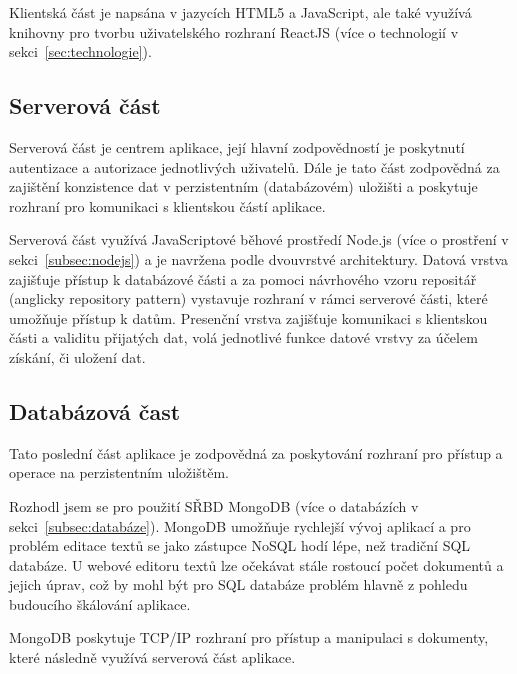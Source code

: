 Klientská část je napsána v jazycích HTML5 a JavaScript, ale také využívá knihovny pro tvorbu uživatelského rozhraní ReactJS (více o technologií v sekci~\ref{sec:technologie}).

\subsection{Serverová část}\label{subsec:serverováČást}

Serverová část je centrem aplikace, její hlavní zodpovědností je poskytnutí autentizace a autorizace jednotlivých uživatelů.
Dále je tato část zodpovědná za zajištění konzistence dat v perzistentním (databázovém) uložišti a poskytuje rozhraní pro komunikaci s klientskou částí aplikace.

Serverová část využívá JavaScriptové běhové prostředí Node.js (více o prostření v sekci~\ref{subsec:nodejs}) a je navržena podle dvouvrstvé architektury.
Datová vrstva zajišťuje přístup k databázové části a za pomoci návrhového vzoru repositář (anglicky repository pattern) vystavuje rozhraní v rámci serverové části, které umožňuje přístup k datům.
Presenční vrstva zajišťuje komunikaci s klientskou části a validitu přijatých dat, volá jednotlivé funkce datové vrstvy za účelem získání, či uložení dat.

\subsection{Databázová čast}\label{subsec:databázováČast}

Tato poslední část aplikace je zodpovědná za poskytování rozhraní pro přístup a operace na perzistentním uložištěm.

Rozhodl jsem se pro použití \gls{SŘBD} MongoDB (více o databázích v sekci~\ref{subsec:databáze}).
MongoDB umožňuje rychlejší vývoj aplikací a pro problém editace textů se jako zástupce \gls{NoSQL} hodí lépe, než tradiční \gls{SQL} databáze.
U webové editoru textů lze očekávat stále rostoucí počet dokumentů a jejich úprav, což by mohl být pro \gls{SQL} databáze problém hlavně z pohledu budoucího škálování aplikace.

MongoDB poskytuje \gls{TCP/IP} rozhraní pro přístup a manipulaci s dokumenty, které následně využívá serverová část aplikace.

